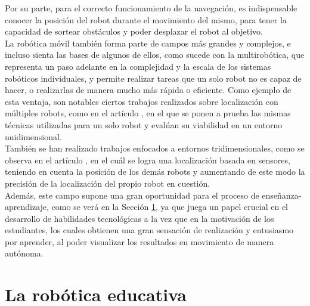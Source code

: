 Por su parte, para el correcto funcionamiento de la navegación, es indispensable
conocer la posición del robot durante el movimiento del mismo, para tener la
capacidad de sortear obstáculos y poder desplazar el robot al objetivo.
\\

La robótica móvil también forma parte de campos más grandes y complejos, e
incluso sienta las bases de algunos de ellos, como sucede con la multirobótica,
que representa un paso adelante en la complejidad y la escala de los sistemas
robóticos individuales, y permite realizar tareas que un solo robot no es capaz
de hacer, o realizarlas de manera mucho más rápida o eficiente.
Como ejemplo de esta ventaja, son notables ciertos trabajos realizados sobre
localización con múltiples robots, como en el artículo \cite{Trawny2009}, en el
que se ponen a prueba las mismas técnicas utilizadas para un solo robot y
evalúan su viabilidad en un entorno unidimensional.
\\

También se han realizado trabajos enfocados a entornos tridimensionales, como se
observa en el artículo \cite{Fox2000}, en el cuál se logra una localización
basada en sensores, teniendo en cuenta la posición de los demás robots y
aumentando de este modo la precisión de la localización del propio robot en
cuestión.
\\

Además, este campo supone una gran oportunidad para el proceso de
enseñanza-aprendizaje, como se verá en la Sección \ref{sec:robotica_educativa},
ya que juega un papel crucial en el desarrollo de habilidades tecnológicas a la
vez que en la motivación de los estudiantes, los cuales obtienen una gran
sensación de realización y entusiasmo por aprender, al poder visualizar los
resultados en movimiento de manera autónoma.



\section{La robótica educativa}
\label{sec:robotica_educativa} %

